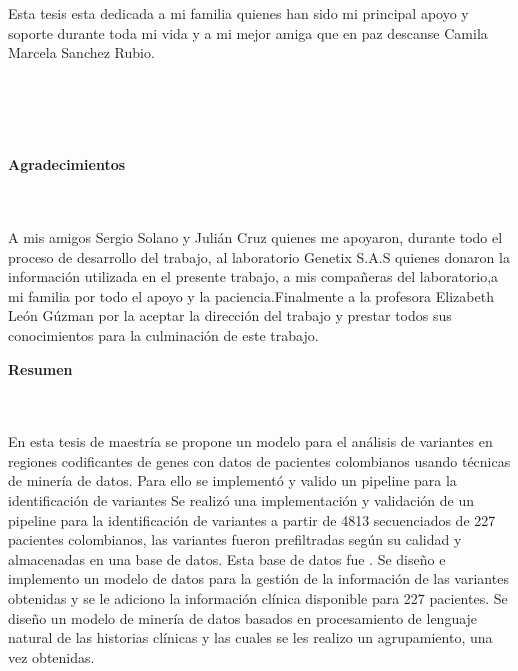 \begin{flushright}
\begin{minipage}{8cm}
    \noindent
        Esta tesis esta dedicada a mi familia quienes han sido mi principal apoyo y soporte durante toda mi vida y a mi mejor amiga que en paz descanse Camila Marcela Sanchez Rubio.\\[1.0cm]\\
      \end{minipage}
\end{flushright}

\newpage{\pagestyle{empty}\cleardoublepage}

\newpage
\thispagestyle{empty} \textbf{}\normalsize
\\\\\\%
\textbf{\LARGE Agradecimientos}
\\\\
A mis amigos Sergio Solano y Julián Cruz quienes me apoyaron, durante todo el proceso de desarrollo del trabajo, al laboratorio Genetix S.A.S quienes donaron la información utilizada en el presente trabajo, a mis compañeras del laboratorio,a mi familia por todo el apoyo y la paciencia.Finalmente a la profesora Elizabeth León Gúzman por la aceptar la dirección del trabajo y prestar todos sus conocimientos para la culminación de este trabajo. \\

\newpage{\pagestyle{empty}\cleardoublepage}

\newpage
\textbf{\LARGE Resumen}
\\\\
En esta tesis de maestría se propone un modelo para el análisis de variantes en regiones codificantes de genes con datos de pacientes colombianos usando técnicas de minería de datos. Para ello se implementó y valido un pipeline para la identificación de variantes Se realizó una implementación y validación de un pipeline para la identificación de variantes a partir de 4813 secuenciados de 227 pacientes colombianos, las variantes fueron prefiltradas según su calidad y almacenadas en una base de datos. Esta base de datos fue . Se diseño e implemento un modelo de datos para la gestión de la información de las variantes obtenidas y se le adiciono la información clínica disponible para 227 pacientes. Se diseño un modelo de minería de datos basados en procesamiento de lenguaje natural de las historias clínicas y las cuales se les realizo un agrupamiento, una vez obtenidas. \\

